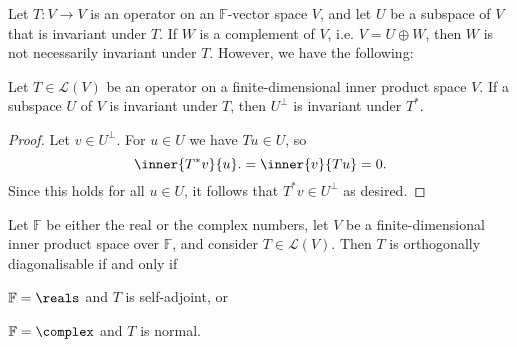\documentclass[article, a4paper, 11pt, oneside]{memoir}
\numberwithin{equation}{chapter}
\newcommand{\calL}{\mathcal{L}}
\newcommand{\field}{\mathbb{F}}
\begin{document}
Let $T \colon V \to V$ is an operator on an $\field$-vector space $V$, and let $U$ be a subspace of $V$ that is invariant under $T$. If $W$ is a complement of $V$, i.e. $V = U \oplus W$, then $W$ is not necessarily invariant under $T$. However, we have the following:

\begin{lemma}
    \label{thm:adjoint-invariant-subspace}
    Let $T \in \calL(V)$ be an operator on a finite-dimensional inner product space $V$. If a subspace $U$ of $V$ is invariant under $T$, then $U^\perp$ is invariant under $T^*$.
\end{lemma}

\begin{proof}
    Let $v \in U^\perp$. For $u \in U$ we have $Tu \in U$, so
    \begin{equation*}
        \inner{T^*v}{u}.
            = \inner{v}{Tu}
            = 0.
    \end{equation*}
    Since this holds for all $u \in U$, it follows that $T^*v \in U^\perp$ as desired.
\end{proof}

\begin{theorem}
    Let $\field$ be either the real or the complex numbers, let $V$ be a finite-dimensional inner product space over $\field$, and consider $T \in \calL(V)$. Then $T$ is orthogonally diagonalisable if and only if
    \begin{enumthm}
        \item $\field = \reals$ and $T$ is self-adjoint, or
        \item $\field = \complex$ and $T$ is normal.
    \end{enumthm}
\end{theorem}
\end{document}
